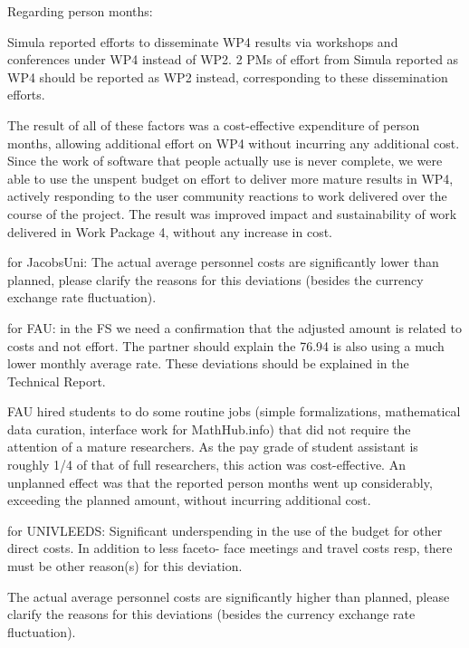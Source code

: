 Regarding person months:

Simula reported efforts to disseminate WP4 results via workshops and conferences under WP4 instead of WP2.
2 PMs of effort from Simula reported as WP4 should be reported as WP2 instead,
corresponding to these dissemination efforts.

The result of all of these factors was a cost-effective expenditure of person months,
allowing additional effort on WP4 without incurring any additional cost.
Since the work of software that people actually use is never complete,
we were able to use the unspent budget on effort to deliver more mature results in WP4,
actively responding to the user community reactions to work delivered over the course of the project.
The result was improved impact and sustainability of work delivered in Work Package 4,
without any increase in cost.




for JacobsUni:
The actual average personnel costs are significantly lower than planned, 
please clarify the reasons for this deviations (besides the currency exchange rate fluctuation).

for FAU:
in the FS we need a confirmation that the adjusted amount is related to costs and not effort.
The partner should explain the 76.94%
is also using a much lower monthly average rate. These deviations should be explained in the
Technical Report.

FAU hired students to do
some routine jobs (simple formalizations, mathematical data curation, interface work for
MathHub.info) that did not require the attention of a mature researchers. As the pay grade
of student assistant is roughly 1/4 of that of full researchers, this action was
cost-effective. An unplanned effect was that the reported person months went up
considerably, exceeding the planned amount, without incurring additional cost.


for UNIVLEEDS:
Significant underspending in the use of the budget for other direct costs. In addition to less faceto-
face meetings and travel costs resp, there must be other reason(s) for this deviation.

The actual average personnel costs are significantly higher than planned, 
please clarify the reasons for this deviations (besides the currency exchange rate fluctuation).


